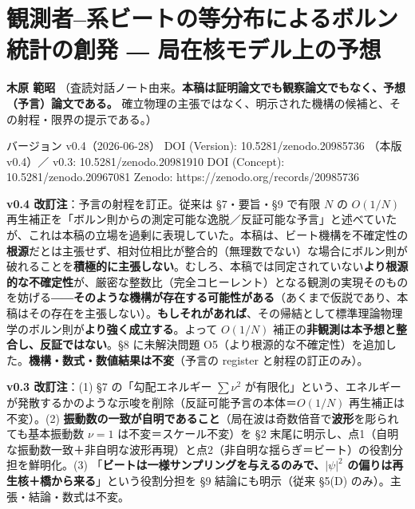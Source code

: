\documentclass[
]{ltjsarticle}
\author{}
\date{}
\begin{document}
\section{観測者--系ビートの等分布によるボルン統計の創発 ―
局在核モデル上の予想}\label{ux89b3ux6e2cux8005ux7cfbux30d3ux30fcux30c8ux306eux7b49ux5206ux5e03ux306bux3088ux308bux30dcux30ebux30f3ux7d71ux8a08ux306eux5275ux767a-ux5c40ux5728ux6838ux30e2ux30c7ux30ebux4e0aux306eux4e88ux60f3}

\textbf{木原 範昭}
（査読対話ノート由来。\textbf{本稿は証明論文でも観察論文でもなく、予想（予言）論文である。}
確立物理の主張ではなく、明示された機構の候補と、その射程・限界の提示である。）

バージョン v0.4（2026-06-28） DOI (Version): 10.5281/zenodo.20985736
（本版 v0.4）／ v0.3: 10.5281/zenodo.20981910 DOI (Concept):
10.5281/zenodo.20967081 Zenodo: https://zenodo.org/records/20985736

\textbf{v0.4 改訂注}：予言の射程を訂正。従来は §7・要旨・§9 で有限 \(N\)
の \(O(1/N)\)
再生補正を「ボルン則からの測定可能な逸脱／反証可能な予言」と述べていたが、これは本稿の立場を過剰に表現していた。本稿は、ビート機構を不確定性の\textbf{根源}だとは主張せず、相対位相比が整合的（無理数でない）な場合にボルン則が破れることを\textbf{積極的に主張しない}。むしろ、本稿では同定されていない\textbf{より根源的な不確定性}が、厳密な整数比（完全コヒーレント）となる観測の実現そのものを妨げる――\textbf{そのような機構が存在する可能性がある}（あくまで仮説であり、本稿はその存在を主張しない）。\textbf{もしそれがあれば}、その帰結として標準理論物理学のボルン則が\textbf{より強く成立する}。よって
\(O(1/N)\) 補正の\textbf{非観測は本予想と整合し、反証ではない}。§8
に未解決問題
O5（より根源的な不確定性）を追加した。\textbf{機構・数式・数値結果は不変}（予言の
register と射程の訂正のみ）。

\textbf{v0.3 改訂注}：(1) §7 の「勾配エネルギー \(\sum\nu^2\)
が有限化」という、エネルギーが発散するかのような示唆を削除（反証可能予言の本体＝\(O(1/N)\)
再生補正は不変）。(2)
\textbf{振動数の一致が自明であること}（局在波は奇数倍音で\textbf{波形}を彫られても基本振動数
\(\nu=1\) は不変＝スケール不変）を §2
末尾に明示し、点1（自明な振動数一致＋非自明な波形再現）と点2（非自明な揺らぎ＝ビート）の役割分担を鮮明化。(3)
「\textbf{ビートは一様サンプリングを与えるのみで、\(|\psi|^2\)
の偏りは再生核＋橋から来る}」という役割分担を §9 結論にも明示（従来
§5(D) のみ）。主張・結論・数式は不変。
\end{document}
